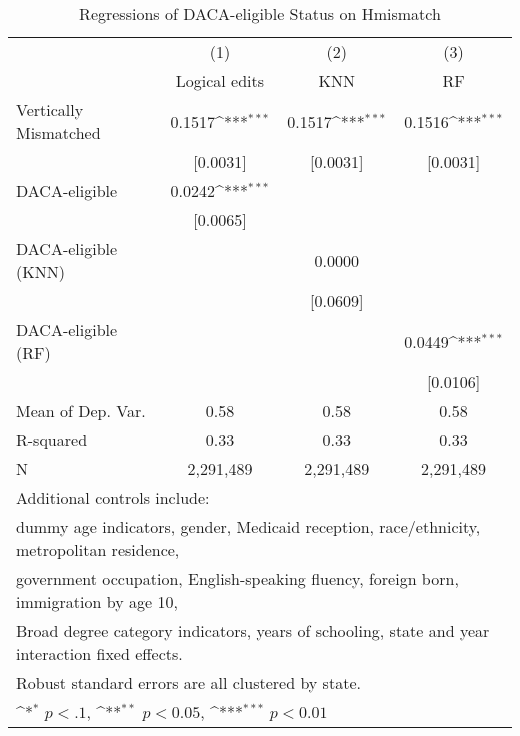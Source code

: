\begin{table}[htbp]\centering
\def\sym#1{\ifmmode^{#1}\else\(^{#1}\)\fi}
\caption{Regressions of DACA-eligible Status on Hmismatch}
\begin{tabular}{l*{3}{c}}
\toprule
                    &\multicolumn{1}{c}{(1)}         &\multicolumn{1}{c}{(2)}         &\multicolumn{1}{c}{(3)}         \\
                    &Logical edits         &         KNN         &          RF         \\
\midrule
Vertically Mismatched&      0.1517\sym{***}&      0.1517\sym{***}&      0.1516\sym{***}\\
                    &    [0.0031]         &    [0.0031]         &    [0.0031]         \\
\addlinespace
DACA-eligible       &      0.0242\sym{***}&                     &                     \\
                    &    [0.0065]         &                     &                     \\
\addlinespace
DACA-eligible (KNN) &                     &      0.0000         &                     \\
                    &                     &    [0.0609]         &                     \\
\addlinespace
DACA-eligible (RF)  &                     &                     &      0.0449\sym{***}\\
                    &                     &                     &    [0.0106]         \\
\midrule
Mean of Dep. Var.   &        0.58         &        0.58         &        0.58         \\
R-squared           &        0.33         &        0.33         &        0.33         \\
N                   &   2,291,489         &   2,291,489         &   2,291,489         \\
\bottomrule
\multicolumn{4}{l}{\footnotesize Additional controls include:}\\
\multicolumn{4}{l}{\footnotesize dummy age indicators, gender, Medicaid reception, race/ethnicity, metropolitan residence,}\\
\multicolumn{4}{l}{\footnotesize government occupation, English-speaking fluency, foreign born, immigration by age 10,}\\
\multicolumn{4}{l}{\footnotesize Broad degree category indicators, years of schooling, state and year interaction fixed effects.}\\
\multicolumn{4}{l}{\footnotesize Robust standard errors are all clustered by state.}\\
\multicolumn{4}{l}{\footnotesize \sym{*} \(p<.1\), \sym{**} \(p<0.05\), \sym{***} \(p<0.01\)}\\
\end{tabular}
\end{table}
